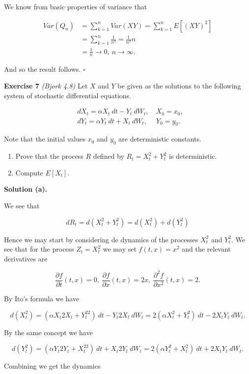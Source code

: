\documentclass[
]{article}
\providecommand{\tightlist}{%
  \setlength{\itemsep}{0pt}\setlength{\parskip}{0pt}}
\begin{document}
We know from basic properties of variance that

\begin{align*}
Var(Q_n)&=\sum_{k=1}^n Var(XY)=\sum_{k=1}^n E[(XY)^2]\\
&=\sum_{k=1}^n\frac{1}{n^2}=\frac{1}{n^2}n\\
&=\frac{1}{n}\to0,\ n\to\infty.
\end{align*}

And so the result follows. \(\square\)

\textbf{Exercise 7} \emph{(Bjork 4.8)} Let \(X\) and \(Y\) be given as
the solutions to the following system of stochastic differential
equations.

\begin{align*}
&dX_t=\alpha X_t\ dt-Y_t\ dW_t,\ &X_0=x_0,\\
&dY_t=\alpha Y_t\ dt + X_t\ dW_t,\ &Y_0=y_0.
\end{align*}

Note that the initial values \(x_0\) and \(y_0\) are deterministic
constants.

\begin{enumerate}
\def\labelenumi{\alph{enumi}.}
\tightlist
\item
  Prove that the process \(R\) defined by \(R_t=X_t^2+Y_t^2\) is
  deterministic.
\item
  Compute \(E[X_t]\).
\end{enumerate}

\textbf{Solution (a).}

We see that

\[
dR_t=d(X_t^2+Y_t^2)=d(X_t^2)+d(Y_t^2)
\]

Hence we may start by considering de dynamics of the processes \(X_t^2\)
and \(Y_t^2\). We see that for the process \(Z_t=X_t^2\) we may set
\(f(t,x)=x^2\) and the relevant derivatives are

\[
\frac{\partial f}{\partial t}(t,x)=0,\ \frac{\partial f}{\partial x}(t,x)=2x,\ \frac{\partial^2 f}{\partial x^2}(t,x)=2.
\]

By Ito's formula we have

\[
d(X_t^2)=\left(\alpha X_t2X_t+Y_t^22\right)\ dt-Y_t2X_t\ dW_t=2(\alpha X_t^2+Y_t^2)\ dt-2X_tY_t\ dW_t.
\]

By the same concept we have

\[
d(Y_t^2)=\left(\alpha Y_t2Y_t+X_t^22\right)\ dt+X_t2Y_t\ dW_t=2(\alpha Y_t^2+X_t^2)\ dt+2X_tY_t\ dW_t.
\]

Combining we get the dynamics
\end{document}
